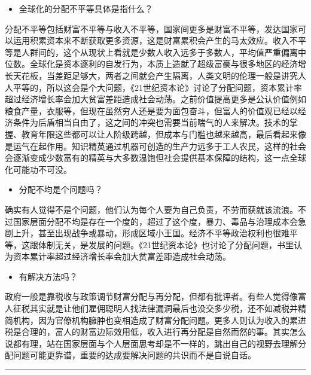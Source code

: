 \documentclass[
  letterpaper,
  DIV=11,
  numbers=noendperiod]{scrreprt}
\providecommand{\tightlist}{%
  \setlength{\itemsep}{0pt}\setlength{\parskip}{0pt}}\usepackage{longtable,booktabs,array}
\begin{document}
\begin{itemize}
\tightlist
\item
  全球化的分配不平等具体是指什么？
\end{itemize}

分配不平等包括财富不平等与收入不平等，国家间更多是财富不平等，发达国家可以运用积累资本来不断获取更多资源，这是财富累积会产生的马太效应。收入不平等是人群间的，这个从现状上看就是少数人收入远多于多数人，平均值严重偏离中位数。全球化是资本逐利的自发行为，本质上造就了超级富豪与很多地区的经济增长天花板，当差距足够大，两者之间就会产生隔离，人类文明的伦理一般是讲究人人平等的，所以这会是个大问题，《21世纪资本论》讨论了分配问题，资本累计率超过经济增长率会加大贫富差距造成社会动荡。之前价值提高更多是公认价值例如粮食产量，衣服等，但现在虽然穷人还是要为面包奋斗，但富人的价值观已经以经济条件为后盾相当自由了，这之间的冲突也需要当前喘气的人来解决。技术的掌握、教育年限这些都可以让人阶级跨越，但成本与门槛也越来越高，最后看起来像是运气在起作用。知识精英通过机器可创造的生产力远多于工人农民，这样的社会会逐渐变成少数富有的精英与大多数温饱但社会提供基本保障的结构，这一点全球化可能功不可没。

\begin{itemize}
\tightlist
\item
  分配不均是个问题吗？
\end{itemize}

确实有人觉得不是个问题，他们认为每个人要为自己负责，不劳而获就该流浪。不过国家层面分配不均是存在一个度的，超过了这个度，暴力、毒品与治理成本会急剧上升，甚至出现战争或暴动，形成区域小王国。经济不平等政治权利也很难平等，这跟体制无关，是发展的问题。《21世纪资本论》也讨论了分配问题，书里认为资本累计率超过经济增长率会加大贫富差距造成社会动荡。

\begin{itemize}
\tightlist
\item
  有解决方法吗？
\end{itemize}

政府一般是靠税收与政策调节财富分配与再分配，但都有批评者。有些人觉得像富人征税其实就是让他们雇佣聪明人找法律漏洞最后也没交多少税，还不如减税并精简机构，因为官僚机构臃肿也变相造成了财富分配问题。更多人则认为收入的累进税是合理的，富人的财富边际效用低，收入进行再分配是自然而然的事。其实怎么说都有理，站在国家层面与个人层面思考却是不一样的，跳出自己的视野去理解分配问题可能更靠谱，重要的达成要解决问题的共识而不是自说自话。

\begin{center}\rule{0.5\linewidth}{0.5pt}\end{center}
\end{document}
